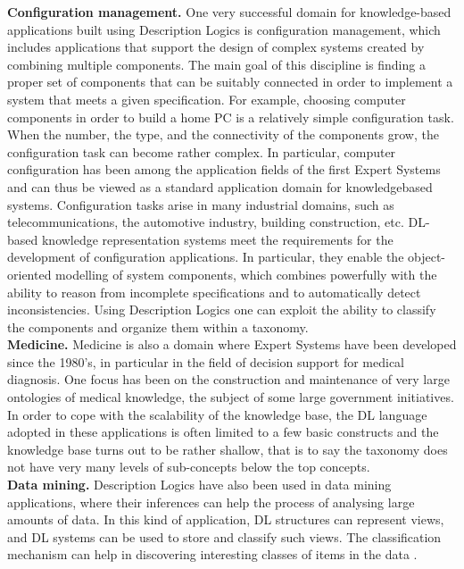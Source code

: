 \documentclass[a4paper, 11pt, oneside]{elsarticle}
\begin{document}
\textbf{Configuration management.} One very successful domain for knowledge-based applications built using Description Logics is configuration management, which includes applications that support the design of complex systems created by combining multiple components.
The main goal of this discipline is finding a proper set of components that can be suitably connected in order to implement a system that meets a given specification.
For example, choosing computer components in order to build a home PC is a relatively simple configuration task. When the number, the type, and the connectivity of the components grow, the configuration task can become rather complex.
In particular, computer configuration has been among the application fields of the first Expert Systems and can thus be viewed as a standard application domain for knowledgebased systems.
Configuration tasks arise in many industrial domains, such as telecommunications, the automotive industry, building construction, etc.
DL-based knowledge representation systems meet the requirements for the development of configuration applications. In particular, they enable the object-oriented modelling of system components, which combines powerfully with the ability to reason from incomplete specifications and to automatically detect inconsistencies. Using Description Logics one can exploit the ability to classify the components and organize them within a taxonomy.\\

\textbf{Medicine.} Medicine is also a domain where Expert Systems have been developed since the 1980’s, in particular in the field of decision support for medical diagnosis. One focus has been on the construction and maintenance of very large ontologies of medical knowledge, the subject of some large government initiatives.
In order to cope with the scalability of the knowledge base, the DL language adopted in these applications is often limited to a few basic constructs and the knowledge base turns out to be rather shallow, that is to say the taxonomy does not have very many levels of sub-concepts below the top concepts.\\

\textbf{Data mining.} Description Logics have also been used in data mining applications, where their inferences can help the process of analysing large amounts of data.
In this kind of application, DL structures can represent views, and DL systems can be used to store and classify such views. The classification mechanism can help in discovering interesting classes of items in the data
\cite{Nardi:2003:IDL:885746.885748}.
\end{document}
